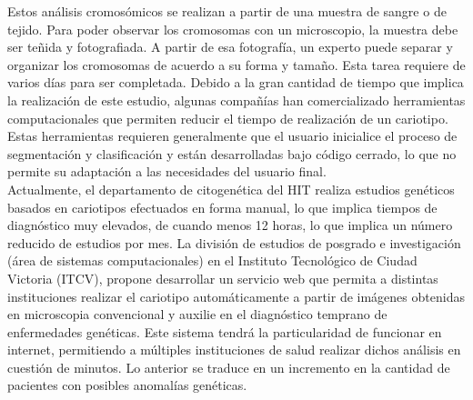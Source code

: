 \documentclass[12pt,letterpaper,titlepage]{article}
\begin{document}
Estos análisis cromosómicos se realizan a partir de una muestra de sangre o de tejido. Para poder observar los cromosomas con un microscopio, la muestra debe ser teñida y fotografiada. A partir de esa fotografía, un experto puede separar y organizar los cromosomas de acuerdo a su forma y tamaño. Esta tarea requiere de varios días para ser completada. Debido a la gran cantidad de tiempo que implica la realización de este estudio, algunas compañías han comercializado herramientas computacionales que permiten reducir el tiempo de realización de un cariotipo. Estas herramientas requieren generalmente que el usuario inicialice el proceso de segmentación y clasificación y están desarrolladas bajo código cerrado, lo que no permite su adaptación a las necesidades del usuario final. \\
%
Actualmente, el departamento de citogenética del HIT realiza estudios genéticos basados en cariotipos efectuados en forma manual, lo que implica tiempos de diagnóstico muy elevados, de cuando menos 12 horas, lo que implica un número reducido de estudios por mes. La división de estudios de posgrado e investigación (área de sistemas computacionales) en el Instituto Tecnológico de Ciudad Victoria (ITCV), propone desarrollar un servicio web que permita a distintas instituciones realizar el cariotipo automáticamente a partir de imágenes obtenidas en microscopia convencional y auxilie en el diagnóstico temprano de enfermedades genéticas. Este sistema tendrá la particularidad de funcionar en internet, permitiendo a múltiples instituciones de salud realizar dichos análisis en cuestión de minutos. Lo anterior se traduce en un incremento en la cantidad de pacientes con posibles anomalías genéticas. \\

\end{document}
